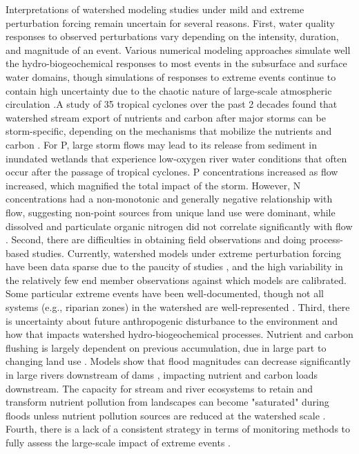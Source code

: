 \documentclass[preprint,review, 12pt]{elsarticle}
\begin{document}
Interpretations of watershed modeling studies under mild and extreme perturbation forcing remain uncertain for several reasons. First, water quality responses to observed perturbations vary depending on the intensity, duration, and magnitude of an event. Various numerical modeling approaches simulate well the hydro-biogeochemical responses to most events in the subsurface and surface water domains, though simulations of responses to extreme events continue to contain high uncertainty due to the chaotic nature of large-scale atmospheric circulation \citep{Shepherd2014}.A study of 35 tropical cyclones over the past 2 decades found that watershed stream export of nutrients and carbon after major storms can be storm-specific, depending on the mechanisms that mobilize the nutrients and carbon \citep{Paerl2018b}. For P, large storm flows may lead to its release from sediment in inundated wetlands that experience low-oxygen river water conditions that often occur after the passage of tropical cyclones.  P concentrations increased as flow increased, which magnified the total impact of the storm. However, N concentrations had a non-monotonic and generally negative relationship with flow, suggesting non-point sources from unique land use were dominant, while dissolved and particulate organic nitrogen did not correlate significantly with flow  \citep{Paerl2018b}. Second, there are difficulties in obtaining field observations and doing process-based studies. Currently, watershed models under extreme perturbation forcing have been data sparse due to the paucity of studies \citep{Kaushal2018g, Vidon2018}, and the high variability in the relatively few end member observations against which models are calibrated. Some particular extreme events have been well-documented, though not all systems (e.g., riparian zones) in the watershed are well-represented \citep{Vidon2018}. Third, there is uncertainty about future anthropogenic disturbance to the environment and how that impacts watershed hydro-biogeochemical processes. Nutrient and carbon flushing is largely dependent on previous accumulation, due in large part to changing land use \citep{Paerl2018b}. Models show that flood magnitudes can decrease significantly in large rivers downstream of dams \citep{Lu2017a}, impacting nutrient and carbon loads downstream.  The capacity for stream and river ecosystems to retain and transform nutrient pollution from landscapes can become "saturated" during floods unless nutrient pollution sources are reduced at the watershed scale \citep{Kaushal2018g}. Fourth, there is a lack of a consistent strategy in terms of monitoring methods to fully assess the large-scale impact of extreme events \citep{Vidon2018}. 
\end{document}
